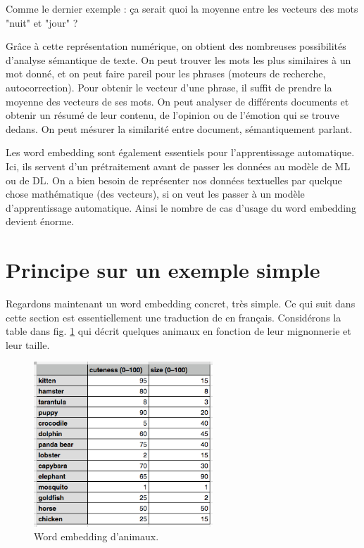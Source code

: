 \documentclass[11pt, a4paper]{report}
\begin{document}
Comme le dernier exemple : ça serait quoi la moyenne entre les vecteurs des mots "nuit" et "jour" ?

Grâce à cette représentation numérique, on obtient des nombreuses 
possibilités d'analyse sémantique de texte. On peut trouver les mots les plus similaires à un mot donné, 
et on peut faire pareil pour les phrases (moteurs de recherche, autocorrection). Pour obtenir 
le vecteur d'une phrase, il suffit de prendre la moyenne des vecteurs de ses mots.  
On peut analyser de différents documents et obtenir un résumé de leur contenu, de l'opinion 
ou de l'émotion qui se trouve dedans. On peut mésurer la similarité entre document, sémantiquement
parlant. 

Les word embedding sont également essentiels pour l'apprentissage automatique. 
Ici, ils servent d'un prétraitement avant de passer les données au modèle de ML ou de DL. 
On a bien besoin de représenter nos données textuelles par quelque chose mathématique (des vecteurs), 
si on veut les passer à un modèle d'apprentissage automatique. Ainsi le nombre de cas d'usage 
du word embedding devient énorme. 


  \section{Principe sur un exemple simple}

Regardons maintenant un word embedding concret, très simple. Ce qui suit dans cette 
section est essentiellement une 
traduction de \cite[\textit{Understanding word vectors}, Allison PARISH]{understanding-word-vectors} 
en français. Considérons la table dans fig. \ref{fig:animaux-word-embedding} qui décrit quelques 
animaux en fonction de leur mignonnerie et leur taille. 

\begin{figure}[h]
  \centering
  \includegraphics[width=0.6\textwidth]{animal-table.png}
  \caption{Word embedding d'animaux.}
  \label{fig:animaux-word-embedding}
\end{figure}
\end{document}
